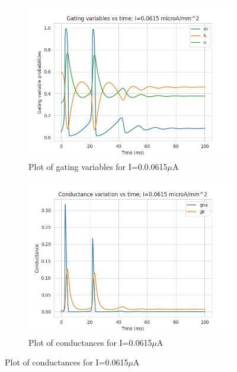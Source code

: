 \documentclass{article}
\begin{document}
\begin{figure}[h]
    \begin{subfigure}[b]{0.45\textwidth}
        \includegraphics[width=1.5\textwidth]{8.jpg}
        \caption{Plot of gating variables for I=0.0.0615$\mu$A}
        \label{fig:IO2}
    \end{subfigure}
    \begin{subfigure}[b]{0.45\textwidth}
        \includegraphics[width=1.5\textwidth]{9.jpg}
        \caption{Plot of conductances for I=0.0615$\mu$A}
        \label{fig:IO2}
    \end{subfigure}
\end{figure}
\newpage
\end{document}
